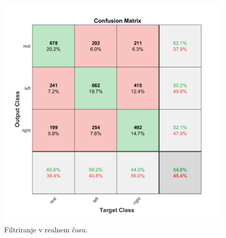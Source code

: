 \begin{figure}[h!]
\begin{center}
\includegraphics[width=0.5\linewidth]{slike/Confusion_my.png}
\end{center}
\caption{Filtriranje v realnem času.}
\end{figure}


